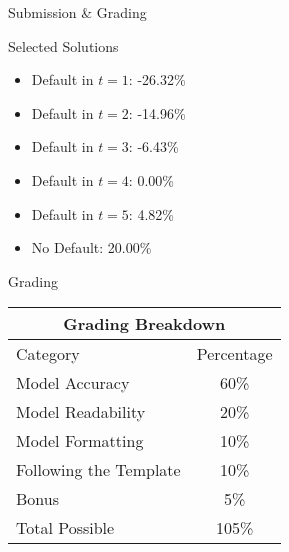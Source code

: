 \documentclass[]{article}
\begin{document}
\begin{section}{Submission \& Grading}
\begin{subsection}{Selected Solutions}
\begin{itemize}
\item Default in $t=1$: -26.32\%
\item Default in $t=2$: -14.96\%
\item Default in $t=3$: -6.43\%
\item Default in $t=4$: 0.00\%
\item Default in $t=5$: 4.82\%
\item No Default: 20.00\%
\end{itemize}
\end{subsection}
\begin{subsection}{Grading}
\begin{center}
\begin{tabular}{lc}
\multicolumn{2}{c}{Grading Breakdown}\\

\toprule
Category & Percentage\\

\cmidrule(lr){1-2}
Model Accuracy & 60\%\\
Model Readability & 20\%\\
Model Formatting & 10\%\\
Following the Template & 10\%\\
Bonus & 5\%\\

\midrule
Total Possible & 105\%\\

\bottomrule
\end{tabular}
\end{center}
\end{subsection}
\end{section}
\end{document}
